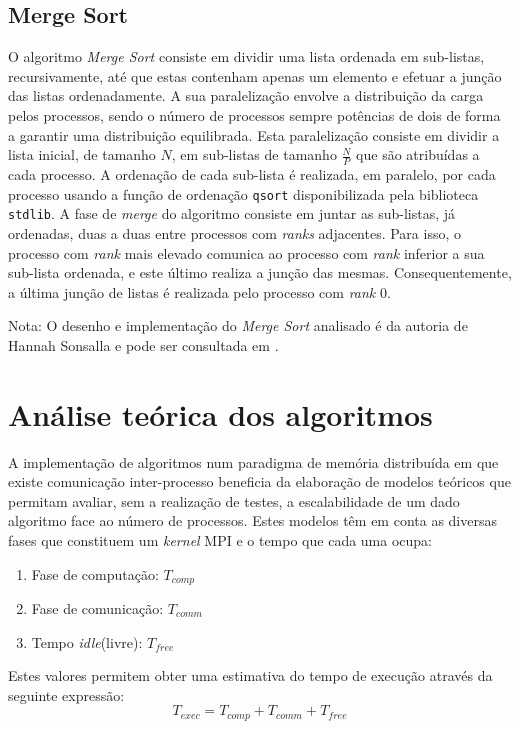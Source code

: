 \documentclass{article}
\begin{document}
\subsection{Merge Sort} \label{abordMerge}
O algoritmo \textit{Merge Sort} consiste em dividir uma lista ordenada em sub-listas, recursivamente, até que estas contenham apenas um elemento 
e efetuar a junção das listas ordenadamente. 
A sua paralelização envolve a distribuição da carga pelos processos, sendo o número de processos sempre potências de dois de forma a garantir uma distribuição equilibrada. Esta paralelização consiste em dividir a lista inicial, de tamanho $N$, em sub-listas de tamanho $\frac{N}{P}$ que são atribuídas a cada processo.
A ordenação de cada sub-lista é realizada, em paralelo, por cada processo usando a função de ordenação \texttt{qsort} disponibilizada pela 
biblioteca \texttt{stdlib}.
A fase de \textit{merge} do algoritmo consiste em juntar as sub-listas, já ordenadas, duas a duas entre processos com \textit{ranks} adjacentes. Para isso,
o processo com \textit{rank} mais elevado comunica ao processo com \textit{rank} inferior a sua sub-lista ordenada, e este último realiza a junção das mesmas.
Consequentemente, a última junção de listas é realizada pelo processo com \textit{rank} 0. \cite{mergeSort}

\footnotesize
Nota: O desenho e implementação do \textit{Merge Sort} analisado é da autoria de Hannah Sonsalla e pode ser consultada em \cite{mergeSortCode}.
\normalsize

\section{Análise teórica dos algoritmos} 

A implementação de algoritmos num paradigma de memória distribuída em que existe 
comunicação inter-processo beneficia da elaboração de modelos teóricos que permitam
avaliar, sem a realização de testes, a escalabilidade de um dado algoritmo face ao número de 
processos. 
Estes modelos têm em conta as diversas fases que constituem um 
\textit{kernel} MPI e o tempo que cada uma ocupa: 
\begin{enumerate}
    \item Fase de computação: $T_{comp}$
    \item Fase de comunicação: $T_{comm}$
    \item Tempo \textit{idle}(livre): $T_{free}$
\end{enumerate}
Estes valores permitem obter uma estimativa do tempo de execução através da seguinte 
expressão: \label{t_par}
$$T_{exec} = T_{comp} + T_{comm} + T_{free}$$
\end{document}
